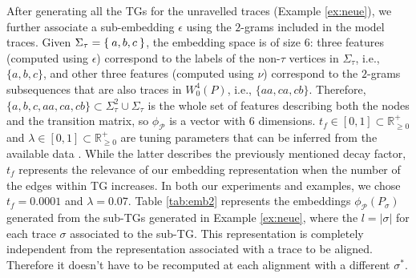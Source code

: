 \begin{example}\label{ex:withpaths} After generating all the TGs for the unravelled traces (Example \ref{ex:neue}), we further associate a sub-embedding $\epsilon$ using the $2$-grams included in the model traces.
Given $\Sigma_\tau=\Set{a,b,c}$, the embedding space is of size $6$: three features (computed using $\epsilon$) correspond to the labels of the non-$\tau$ vertices in $\Sigma_\tau$, i.e., $\{a,b,c\}$, and other three features (computed using $\nu$) correspond to the $2$-grams subsequences that are also traces in $W^4_0(P)$, i.e., $\{aa,ca,cb\}$. Therefore, $\{a,b,c,aa,ca,cb\}\subset \Sigma_\tau^2\cup\Sigma_\tau$ is the whole set of features describing both the nodes and the transition matrix, so $\phi_{\mathcal{P}}$ is a vector with 6 dimensions.
$t_f\in [0,1]\subset\mathbb{R}^+_{\geq 0}$ and $\lambda\in [0,1]\subset\mathbb{R}^+_{\geq 0}$ are tuning parameters that can be inferred from the available data \cite{DriessensRG06}. While the latter describes the previously mentioned decay factor, $t_f$ represents the relevance of our embedding representation when the number of the edges within TG increases. In both our experiments and examples, we chose $t_f=0.0001$ and $\lambda=0.07$.
Table \ref{tab:emb2} represents the embeddings $\phi_{\mathcal{P}}(P_\sigma)$ generated from the sub-TGs generated in Example \ref{ex:neue}, where the $l=|\sigma|$ for each trace $\sigma$ associated to the sub-TG. This representation is completely independent from the representation associated with a trace to be aligned. Therefore it doesn't have to be recomputed at each alignment with a different $\sigma^*$.

\end{example}
